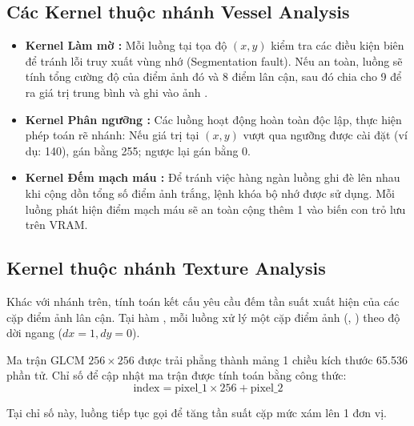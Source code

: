 \subsection{Các Kernel thuộc nhánh Vessel Analysis}

\begin{itemize}
    \item \textbf{Kernel Làm mờ :} Mỗi luồng tại tọa độ $(x, y)$ kiểm tra các điều kiện biên để tránh lỗi truy xuất vùng nhớ (Segmentation fault). Nếu an toàn, luồng sẽ tính tổng cường độ của điểm ảnh đó và 8 điểm lân cận, sau đó chia cho 9 để ra giá trị trung bình và ghi vào ảnh .
    
    \item \textbf{Kernel Phân ngưỡng :} Các luồng hoạt động hoàn toàn độc lập, thực hiện phép toán rẽ nhánh: Nếu giá trị tại $(x,y)$ vượt qua ngưỡng được cài đặt (ví dụ: 140), gán bằng 255; ngược lại gán bằng 0.
    
    \item \textbf{Kernel Đếm mạch máu :} Để tránh việc hàng ngàn luồng ghi đè lên nhau khi cộng dồn tổng số điểm ảnh trắng, lệnh khóa bộ nhớ  được sử dụng. Mỗi luồng phát hiện điểm mạch máu sẽ an toàn cộng thêm 1 vào biến con trỏ  lưu trên VRAM.
\end{itemize}

\subsection{Kernel thuộc nhánh Texture Analysis}

Khác với nhánh trên, tính toán kết cấu yêu cầu đếm tần suất xuất hiện của các cặp điểm ảnh lân cận. Tại hàm , mỗi luồng xử lý một cặp điểm ảnh (, ) theo độ dời ngang ($dx = 1, dy = 0$).

Ma trận GLCM $256 \times 256$ được trải phẳng thành mảng 1 chiều kích thước 65.536 phần tử. Chỉ số để cập nhật ma trận được tính toán bằng công thức:
\begin{equation}
    \text{index} = \text{pixel\_1} \times 256 + \text{pixel\_2}
    \label{eq:glcm_index}
\end{equation}

Tại chỉ số này, luồng tiếp tục gọi  để tăng tần suất cặp mức xám lên 1 đơn vị.


